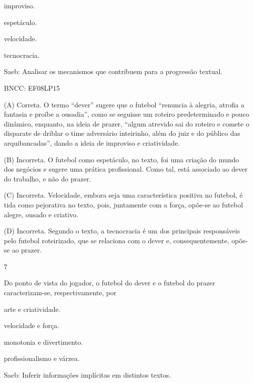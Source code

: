 \begin{escolha}
\item improviso.

\item espetáculo.

\item velocidade.

\item tecnocracia.
\end{escolha}

Saeb: Analisar os mecanismos que contribuem para a progressão textual.

BNCC: EF08LP15

(A) Correta. O termo ``dever'' sugere que o futebol ``renuncia à
alegria, atrofia a fantasia e proíbe a ousadia'', como se seguisse um
roteiro predeterminado e pouco dinâmico, enquanto, na ideia de prazer,
``algum atrevido sai do roteiro e comete o disparate de driblar o time
adversário inteirinho, além do juiz e do público das arquibancadas'',
dando a ideia de improviso e criatividade.

(B) Incorreta. O futebol como espetáculo, no texto, foi uma criação do
mundo dos negócios e sugere uma prática profissional. Como tal, está
associado ao dever do trabalho, e não do prazer.

(C) Incorreta. Velocidade, embora seja uma característica positiva no
futebol, é tida como pejorativa no texto, pois, juntamente com a força,
opõe-se ao futebol alegre, ousado e criativo.

(D) Incorreta. Segundo o texto, a tecnocracia é um dos principais
responsáveis pelo futebol roteirizado, que se relaciona com o dever e,
consequentemente, opõe-se ao prazer.

\num{7}

Do ponto de vista do jogador, o futebol do dever e o futebol do prazer
caracterizam-se, respectivamente, por

\begin{escolha}
\item arte e criatividade.

\item velocidade e força.

\item monotonia e divertimento.

\item profissionalismo e várzea.
\end{escolha}

Saeb: Inferir informações implícitas em distintos textos.

